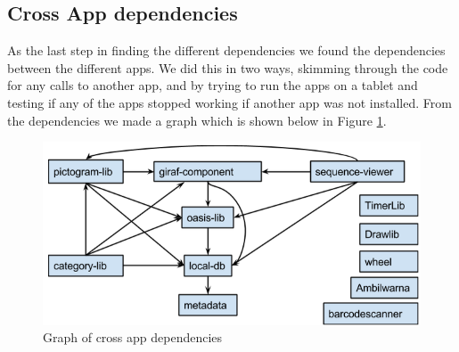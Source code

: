\subsection{Cross App dependencies}
As the last step in finding the different dependencies we found the dependencies between the different apps. We did this in two ways, skimming through the code for any calls to another app, and by trying to run the apps on a tablet and testing if any of the apps  stopped working if another app was not installed. From the dependencies we made a graph which is shown below in Figure \ref{AppAppdependencies}.

\begin{figure}[H]
	\centering
	\includegraphics[width=0.8 \textwidth]{pictures/LibLibdependencies.png}
	\caption{Graph of cross app dependencies}
	\label{AppAppdependencies}
\end{figure}